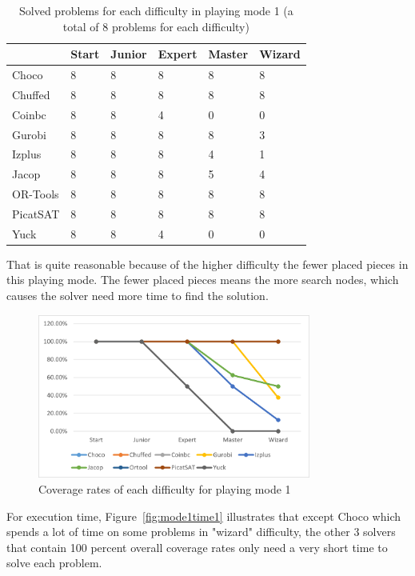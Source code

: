 \begin{table}[H]
\centering
\caption{Solved problems for each difficulty in playing mode 1 (a total of 8 problems for each difficulty)}
\label{tab:solvedproblemforeach difficulty1}
\begin{tabular}{|l|l|l|l|l|l|}
\hline
	    &Start	&Junior	&Expert	&Master	&Wizard\\
\hline
Choco	&8	&8	&8	&8	&8\\
\hline
Chuffed	&8	&8	&8	&8	&8\\
\hline
Coinbc	&8	&8	&4	&0	&0\\
\hline
Gurobi	&8	&8	&8	&8	&3\\
\hline
Izplus	&8	&8	&8	&4	&1\\
\hline
Jacop	&8	&8	&8	&5	&4\\
\hline
OR-Tools	&8	&8	&8	&8	&8\\
\hline
PicatSAT	&8	&8	&8	&8	&8\\
\hline
Yuck	&8	&8	&4	&0	&0\\
\hline
\end{tabular}
\end{table}
That is quite reasonable because of the higher difficulty the fewer placed pieces in this playing mode. The fewer placed pieces means the more search nodes, which causes the solver need more time to find the solution.
\begin{figure}[H]
    \centering
    \includegraphics[width=0.8\textwidth]{figs/mode1seperatedcoverage.png}
    \caption{Coverage rates of each difficulty for playing mode 1}
    \label{fig:mode1eva4}
\end{figure}
For execution time, Figure~\ref{fig:mode1time1} illustrates that except Choco which spends a lot of time on some problems in  "wizard" difficulty, the other 3 solvers that contain 100 percent overall coverage rates only need a very short time to solve each problem. 
